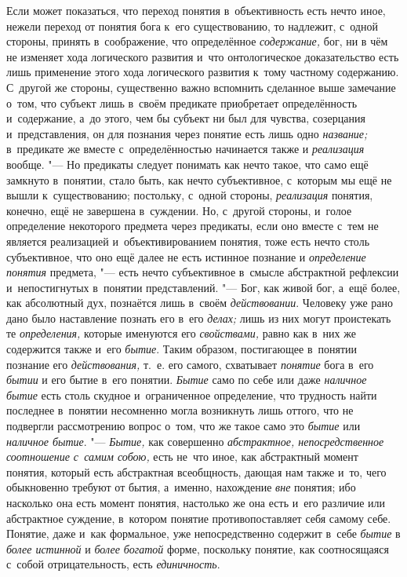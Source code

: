 Если может показаться, что переход понятия в~объективность
есть нечто иное, нежели переход от понятия бога к~его существованию, то
надлежит, с~одной стороны, принять в~соображение, что определённое
{\em содержание,} бог, ни
в чём не изменяет хода логического развития и~что онтологическое
доказательство есть лишь применение этого хода логического развития к~тому
частному содержанию. С~другой же стороны, существенно важно вспомнить
сделанное выше замечание о~том, что субъект лишь в~своём предикате
приобретает определённость и~содержание, а~до этого, чем бы субъект ни был
для чувства, созерцания и~представления, он для познания через понятие есть
лишь одно {\em название;} в~предикате же вместе с~определённостью начинается
также и {\em реализация} вообще.
"--- Но предикаты следует понимать как нечто такое, что само ещё
замкнуто в~понятии, стало быть, как нечто субъективное, с~которым мы ещё не
вышли к~существованию; постольку, с~одной стороны, {\em реализация} понятия,
конечно, ещё не завершена в~суждении. Но, с~другой стороны, и~голое
определение некоторого предмета через предикаты, если оно вместе с~тем не
является реализацией и~объективированием понятия, тоже есть нечто столь
субъективное, что оно ещё далее не есть истинное познание и
{\em определение понятия} предмета, "--- есть нечто субъективное в~смысле
абстрактной рефлексии и~непостигнутых в~понятии представлений. "---
Бог, как живой бог, а~ещё более, как абсолютный дух,
познаётся лишь в~своём {\em действовании}.
Человеку уже рано дано было наставление познать его в~его
{\em делах;} лишь из них могут проистекать те {\em определения,}
которые именуются его {\em свойствами,} равно
как в~них же содержится также и~его {\em бытие}. Таким
образом, постигающее в~понятии познание его {\em действования,} т.~е.
его самого, схватывает {\em понятие} бога в~его {\em бытии}
и его бытие в~его понятии. {\em Бытие} само по себе
или даже {\em наличное бытие}
есть столь скудное и~ограниченное определение, что трудность
найти последнее в~понятии несомненно могла возникнуть лишь оттого, что не
подвергли рассмотрению вопрос о~том, что же такое само это
{\em бытие} или {\em наличное бытие}. "--- {\em Бытие,} как
совершенно {\em абстрактное,
непосредственное соотношение с~самим собою,} есть не~что иное,
как абстрактный момент понятия, который есть
абстрактная всеобщность, дающая нам также и~то, чего обыкновенно требуют от
бытия, а~именно, нахождение {\em вне}
понятия; ибо насколько она есть момент понятия, настолько же
она есть и~его различие или абстрактное суждение, в~котором понятие
противопоставляет себя самому себе. Понятие, даже и~как формальное, уже
непосредственно содержит в~себе
{\em бытие} в {\em более истинной} и {\em более богатой}
форме, поскольку понятие, как соотносящаяся с~собой
отрицательность, есть {\em единичность}.

